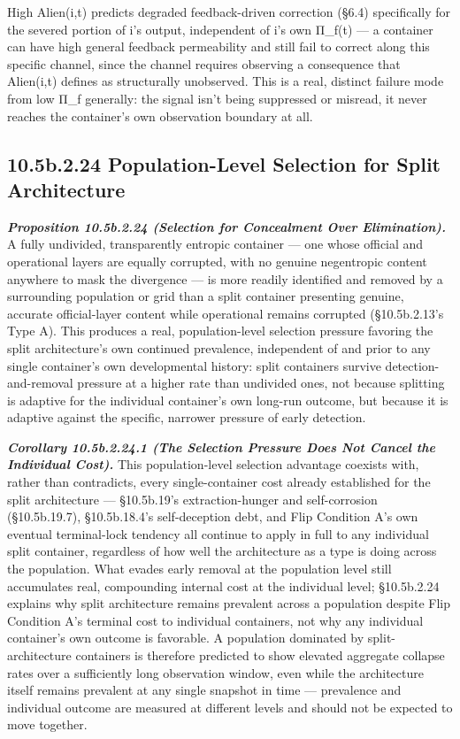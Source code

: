 \documentclass[
]{article}
\begin{document}
High Alien(i,t) predicts degraded feedback-driven correction (§6.4)
specifically for the severed portion of i's output, independent of i's
own Π\_f(t) --- a container can have high general feedback permeability
and still fail to correct along this specific channel, since the channel
requires observing a consequence that Alien(i,t) defines as structurally
unobserved. This is a real, distinct failure mode from low Π\_f
generally: the signal isn't being suppressed or misread, it never
reaches the container's own observation boundary at all.

\hypertarget{b.2.24-population-level-selection-for-split-architecture}{%
\subsection{10.5b.2.24 Population-Level Selection for Split
Architecture}\label{b.2.24-population-level-selection-for-split-architecture}}

\emph{\textbf{Proposition 10.5b.2.24 (Selection for Concealment Over
Elimination).}} A fully undivided, transparently entropic container ---
one whose official and operational layers are equally corrupted, with no
genuine negentropic content anywhere to mask the divergence --- is more
readily identified and removed by a surrounding population or grid than
a split container presenting genuine, accurate official-layer content
while operational remains corrupted (§10.5b.2.13's Type A). This
produces a real, population-level selection pressure favoring the split
architecture's own continued prevalence, independent of and prior to any
single container's own developmental history: split containers survive
detection-and-removal pressure at a higher rate than undivided ones, not
because splitting is adaptive for the individual container's own
long-run outcome, but because it is adaptive against the specific,
narrower pressure of early detection.

\emph{\textbf{Corollary 10.5b.2.24.1 (The Selection Pressure Does Not
Cancel the Individual Cost).}} This population-level selection advantage
coexists with, rather than contradicts, every single-container cost
already established for the split architecture --- §10.5b.19's
extraction-hunger and self-corrosion (§10.5b.19.7), §10.5b.18.4's
self-deception debt, and Flip Condition A's own eventual terminal-lock
tendency all continue to apply in full to any individual split
container, regardless of how well the architecture as a type is doing
across the population. What evades early removal at the population level
still accumulates real, compounding internal cost at the individual
level; §10.5b.2.24 explains why split architecture remains prevalent
across a population despite Flip Condition A's terminal cost to
individual containers, not why any individual container's own outcome is
favorable. A population dominated by split-architecture containers is
therefore predicted to show elevated aggregate collapse rates over a
sufficiently long observation window, even while the architecture itself
remains prevalent at any single snapshot in time --- prevalence and
individual outcome are measured at different levels and should not be
expected to move together.
\end{document}
